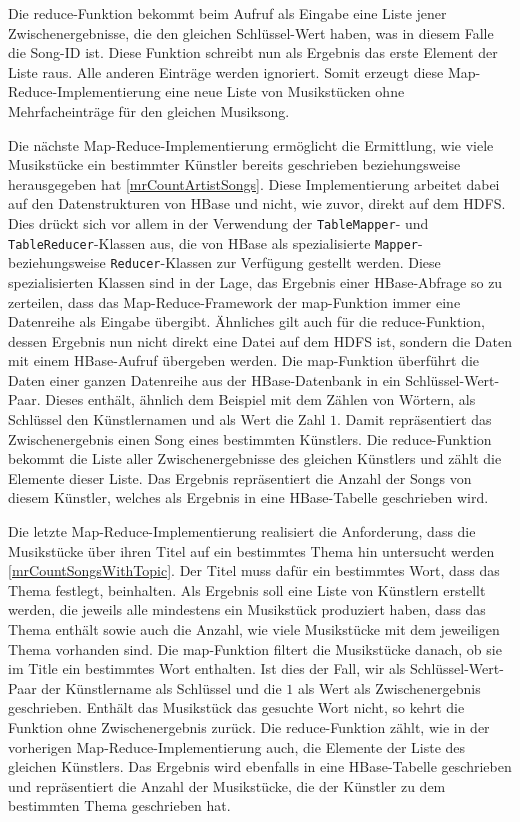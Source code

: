 Die reduce-Funktion bekommt beim Aufruf als Eingabe eine Liste jener Zwischenergebnisse, die den gleichen 
Schlüssel-Wert haben, was in diesem Falle die Song-ID ist. 
Diese Funktion schreibt nun als Ergebnis das erste Element der Liste raus. Alle anderen
Einträge werden ignoriert. Somit erzeugt diese Map-Reduce-Implementierung eine neue Liste
von Musikstücken ohne Mehrfacheinträge für den gleichen Musiksong.

Die nächste Map-Reduce-Implementierung  ermöglicht die Ermittlung, wie viele 
Musikstücke ein bestimmter Künstler bereits geschrieben beziehungsweise herausgegeben
hat \ref{mrCountArtistSongs}. Diese Implementierung arbeitet dabei auf den Datenstrukturen von HBase und nicht,
wie zuvor, direkt auf dem HDFS. Dies drückt sich vor allem in der Verwendung der 
\texttt{TableMapper}- und \texttt{TableReducer}-Klassen aus, die von HBase als spezialisierte \texttt{Mapper}- beziehungsweise \texttt{Reducer}-Klassen zur Verfügung gestellt werden.
Diese spezialisierten Klassen sind in der Lage, das Ergebnis einer HBase-Abfrage so zu
zerteilen, dass das Map-Reduce-Framework der map-Funktion immer eine Datenreihe 
als Eingabe übergibt. Ähnliches gilt auch für die reduce-Funktion, dessen Ergebnis
nun nicht direkt eine Datei auf dem HDFS ist, sondern die Daten mit einem HBase-Aufruf übergeben
werden.
Die map-Funktion überführt die Daten einer ganzen
Datenreihe aus der HBase-Datenbank in ein Schlüssel-Wert-Paar. Dieses enthält, ähnlich 
dem Beispiel mit dem Zählen von Wörtern, als Schlüssel den Künstlernamen und als Wert
die Zahl $1$. Damit repräsentiert das Zwischenergebnis einen Song eines bestimmten Künstlers.
Die reduce-Funktion bekommt die Liste aller
Zwischenergebnisse des gleichen Künstlers und zählt die Elemente dieser Liste. Das Ergebnis
repräsentiert die Anzahl der Songs von diesem Künstler, welches als Ergebnis in eine 
HBase-Tabelle geschrieben wird.

Die letzte Map-Reduce-Implementierung realisiert die Anforderung, dass die Musikstücke über
ihren Titel auf ein bestimmtes Thema hin untersucht werden \ref{mrCountSongsWithTopic}. Der Titel muss dafür ein bestimmtes
Wort, dass das Thema festlegt, beinhalten. Als Ergebnis soll eine Liste von Künstlern erstellt werden,
die jeweils alle mindestens ein Musikstück produziert haben, dass das Thema enthält sowie auch
die Anzahl, wie viele Musikstücke mit dem jeweiligen Thema vorhanden sind.
Die map-Funktion filtert die Musikstücke danach, ob sie im Title ein bestimmtes Wort enthalten.
Ist dies der Fall, wir als Schlüssel-Wert-Paar der Künstlername als Schlüssel und die $1$ als 
Wert als Zwischenergebnis geschrieben. Enthält das Musikstück das gesuchte Wort nicht,
so kehrt die Funktion ohne Zwischenergebnis zurück.
Die reduce-Funktion zählt, wie in der vorherigen Map-Reduce-Implementierung auch, die Elemente der Liste des gleichen Künstlers.
Das Ergebnis wird ebenfalls in eine HBase-Tabelle geschrieben und repräsentiert die Anzahl der Musikstücke, die der
Künstler zu dem bestimmten Thema geschrieben hat.